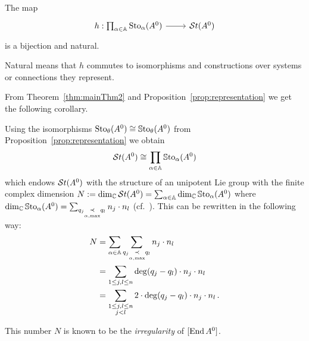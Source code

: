 \begin{center}
  \begin{minipage}[t]{0.8\textwidth}
    \begin{tthm}\label{thm:mainThm2}
      The map
      \[ \begin{tikzcd}
          h:\prod_{\alpha\in\A}\Sto_\alpha(A^0) \rar& \St(A^0)
      \end{tikzcd} \]
      is a bijection and natural.
      \begin{s-rem}
        Natural means that $h$ commutes to isomorphisms and constructions over
        systems or connections they represent.
      \end{s-rem}
    \end{tthm}
  \end{minipage}
\end{center}
From Theorem~\ref{thm:mainThm2} and Proposition~\ref{prop:representation} we
get the following corollary.
\begin{cor}\label{cor:isomToChochN}
  Using the isomorphisms $\operatorname{Sto}_\theta(A^0)\cong\operatorname{\mathbb{S}to}_\theta(A^0)$ from
  Proposition~\ref{prop:representation} we obtain
  \[
    \mathcal{S}{}t(A^0) \cong \prod_{\alpha\in\mathbb{A}}\operatorname{\mathbb{S}to}_\alpha(A^0)
  \]
  which endows $\mathcal{S}{}t(A^0)$ with the structure of an unipotent Lie group with the
  finite complex dimension
  $N:=\dim_\mathbb{C}\mathcal{S}{}t(A^0)=\sum_{\alpha\in\mathbb{A}}\dim_\mathbb{C}\operatorname{\mathbb{S}to}_\alpha(A^0)$ where
  $\dim_\mathbb{C}\operatorname{\mathbb{S}to}_\alpha(A^0)=\sum_{q_j\underset{\alpha,\max}{\prec} q_l}
  n_j\cdot n_l$ (cf.~\cite[Sec.III.1]{Loday1994}).
  This can be rewritten in the following way:
  \begin{align*}
    N&=\sum_{\alpha\in\mathbb{A}}\sum_{q_j\underset{\alpha,\max}{\prec}q_l}n_j\cdot n_l
    \\&= \sum_{1\leq j,l\leq n}\deg(q_j-q_l)\cdot n_j\cdot n_l
    \\&=\sum_{\substack{1\leq j,l\leq n\\j<l}}2\cdot\deg(q_j-q_l)\cdot
      n_j\cdot n_l \,.
  \end{align*}
  \begin{s-rem}
    This number $N$ is known to be the \emph{irregularity} of $[\operatorname{End} A^0]$.
  \end{s-rem}
\end{cor}
